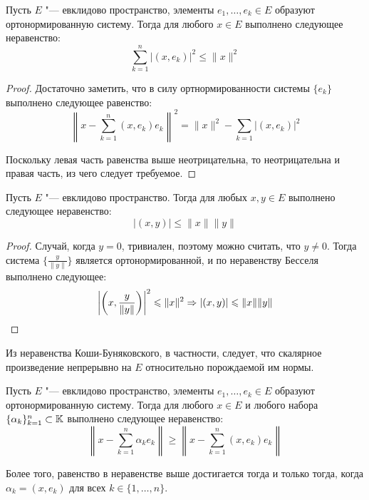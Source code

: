 \begin{proposition}
	Пусть $E$ "--- евклидово пространство, элементы $e_1, \dotsc, e_k \in E$ образуют ортонормированную систему. Тогда для любого $x \in E$ выполнено следующее неравенство:
	\[\sum_{k = 1}^n|(x, e_k)|^2 \le \|x\|^2\]
\end{proposition}

\begin{proof}
	Достаточно заметить, что в силу ортнормированности системы $\{e_k\}$ выполнено следующее равенство:
	\[\left\|x - \sum_{k = 1}^n(x, e_k)e_k\right\|^2 = \|x\|^2 - \sum_{k = 1}|(x, e_k)|^2\]

	Поскольку левая часть равенства выше неотрицательна, то неотрицательна и правая часть, из чего следует требуемое.
\end{proof}

\begin{corollary}
	Пусть $E$ "--- евклидово пространство. Тогда для любых $x, y \in E$ выполнено следующее неравенство:
	\[|(x, y)| \le \|x\|\|y\|\]
\end{corollary}

\begin{proof}
	Случай, когда $y = 0$, тривиален, поэтому можно считать, что $y \ne 0$. Тогда система $\big\{\frac{y}{\|y\|}\big\}$ является ортонормированной, и по неравенству Бесселя выполнено следующее:
	\[\left|\left(x, \frac y{\|y\|}\right)\right|^2 \leqslant \|x\|^2 \Rightarrow |(x, y)| \leqslant \|x\|\|y\|\qedhere\]
\end{proof}

\begin{note}
	Из неравенства Коши-Буняковского, в частности, следует, что скалярное произведение непрерывно на $E$ относительно порождаемой им нормы.
\end{note}

\begin{proposition}\label{minproperty}
	Пусть $E$ "--- евклидово пространство, элементы $e_1, \dotsc, e_k \in E$ образуют ортонормированную систему. Тогда для любого $x \in E$ и любого набора $\{\alpha_k\}_{k = 1}^n \subset \mathbb{K}$ выполнено следующее неравенство:
	\[\left\|x - \sum_{k = 1}^n \alpha_ke_k\right\| \ge \left\|x - \sum_{k = 1}^n (x, e_k)e_k\right\|\]

	Более того, равенство в неравенстве выше достигается тогда и только тогда, когда $\alpha_k = (x, e_k)$ для всех $k \in \{1, \dotsc, n\}$.
\end{proposition}

